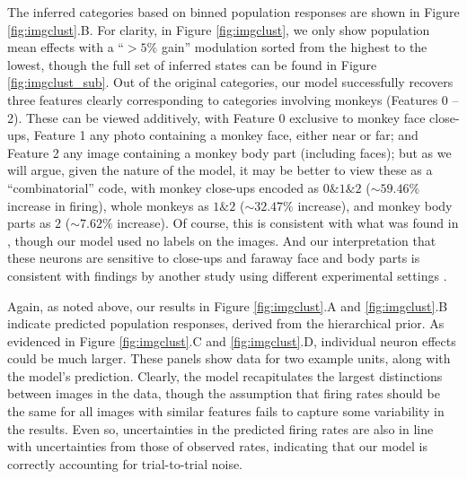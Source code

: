 \documentclass[12pt,a4paper]{article}
\begin{document}
The inferred categories based on binned population responses are shown in Figure \ref{fig:imgclust}.B. For clarity, in Figure \ref{fig:imgclust}, we only show population mean effects with a ``$>5\%$ gain'' modulation sorted from the highest to the lowest, though the full set of inferred states can be found in Figure \ref{fig:imgclust_sub}. Out of the original categories, our model successfully recovers three features clearly corresponding to categories involving monkeys (Features 0 -- 2). These can be viewed additively, with Feature 0 exclusive to monkey face close-ups, Feature 1 any photo containing a monkey face, either near or far; and Feature 2 any image containing a monkey body part (including faces); but as we will argue, given the nature of the model, it may be better to view these as a ``combinatorial'' code, with monkey close-ups encoded as $0\& 1\& 2$ ($\sim 59.46\%$ increase in firing), whole monkeys as $1\& 2$ ($\sim 32.47\%$ increase), and monkey body parts as $2$ ($\sim 7.62\%$ increase). Of course, this is consistent with what was found in \cite{McMahon2014-qq}, though our model used no labels on the images. And our interpretation that these neurons are sensitive to close-ups and faraway face and body parts is consistent with findings by another study using different experimental settings \cite{McMahon5537}.

Again, as noted above, our results in Figure \ref{fig:imgclust}.A and \ref{fig:imgclust}.B indicate predicted population responses, derived from the hierarchical prior. As evidenced in Figure \ref{fig:imgclust}.C and \ref{fig:imgclust}.D, individual neuron effects could be much larger. These panels show data for two example units, along with the model's prediction. Clearly, the model recapitulates the largest distinctions between images in the data, though the assumption that firing rates should be the same for all images with similar features fails to capture some variability in the results. Even so, uncertainties in the predicted firing rates are also in line with uncertainties from those of observed rates, indicating that our model is correctly accounting for trial-to-trial noise.
\end{document}
